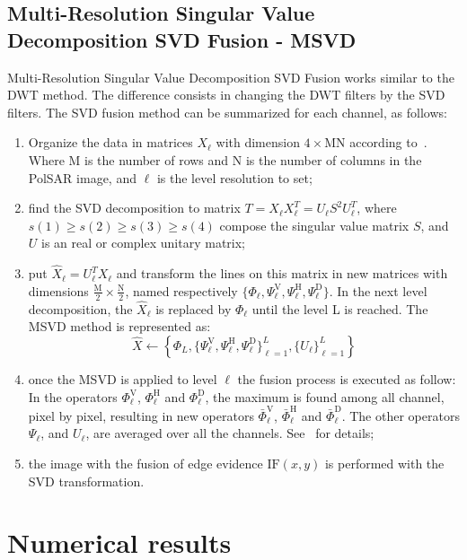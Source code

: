 \documentclass[journal]{IEEEtran}
\begin{document}
\subsection{Multi-Resolution Singular Value Decomposition SVD Fusion - MSVD~\cite{naidu}}
Multi-Resolution Singular Value Decomposition SVD Fusion works similar to the DWT method. The difference consists in changing the DWT filters by the SVD filters. The SVD fusion method can be summarized for each channel, as follows:
\begin{enumerate}
\item Organize the data in matrices $X_\ell$ with dimension $4\times\text{MN}$ according to~\cite{naidu}. Where M is the number of rows and N is the number of columns in the PolSAR image, and $\ell$ is the level resolution to set;  
\item find the SVD decomposition to matrix $T=X_\ell X_\ell^T=U_\ell S^2 U_\ell^T$, where $s(1)\geq s(2) \geq s(3) \geq s(4)$ compose the singular value matrix $S$, and $U$ is an real or complex unitary matrix;
\item put $\widehat{X}_\ell=U_\ell^TX_\ell$ and transform the lines on this matrix in new matrices with dimensions $\frac{\text{M}}{2}\times\frac{\text{N}}{2}$, named respectively $\{\Phi_\ell, \Psi_\ell^\text{V}, \Psi_\ell^\text{H}, \Psi_\ell^\text{D}\}$. In the next level decomposition, the $\widehat{X}_\ell$ is replaced by $\Phi_\ell$ until the level L is reached. The MSVD method is represented as:
\begin{equation}\label{msvd_iter}
\widehat{X}\leftarrow \left\{\Phi_L,\{\Psi_\ell^\text{V},\Psi_\ell^\text{H},\Psi_\ell^\text{D} \}_{\ell=1}^L,\{U_\ell\}_{\ell=1}^L \right\}
\end{equation}
\item once the MSVD is applied to level $\ell$ the fusion process is executed as follow: In the operators $\Phi_\ell^\text{V}$, $\Phi_\ell^\text{H}$ and $\Phi_\ell^\text{D}$, the maximum is found among all channel, pixel by pixel, resulting in new operators $\bar{\Phi}_\ell^\text{V}$, $\bar{\Phi}_\ell^\text{H}$ and $\bar{\Phi}_\ell^\text{D}$. The other operators $\Psi_\ell$, and $U_\ell$, are averaged over all the channels. See~\cite{naidu} for details;
\item the image with the fusion of edge evidence $\text{IF}(x,y)$ is performed with the SVD transformation. 
\end{enumerate}
\section{Numerical results}\label{sec_05}
\end{document}
